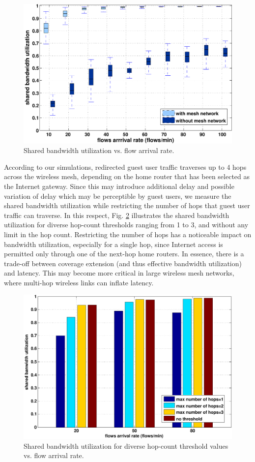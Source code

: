 \begin{figure}[t]
\begin{center}
\includegraphics[width=1\linewidth]{results/boxplot2.pdf}
\caption{Shared bandwidth utilization vs. flow arrival rate.}
\label{fig:utilization_arrival}
\end{center}
\end{figure}

According to our simulations, redirected guest user traffic traverses up to 4 hops across the wireless mesh, depending on the home router that has been selected as the Internet gateway. Since this may introduce additional delay and possible variation of delay which may be perceptible by guest users, we measure the shared bandwidth utilization while restricting the number of hops that guest user traffic can traverse. In this respect, Fig. \ref{fig:hop_count} illustrates the shared bandwidth utilization for diverse hop-count thresholds ranging from 1 to 3, and without any limit in the hop count. Restricting the number of hops has a noticeable impact on bandwidth utilization, especially for a single hop, since Internet access is permitted only through one of the next-hop home routers. In essence, there is a trade-off between coverage extension (and thus effective bandwidth utilization) and latency. This may become more critical in large wireless mesh networks, where multi-hop wireless links can inflate latency.


\begin{figure}[t]
\begin{center}
\includegraphics[width=1\linewidth]{results/hops_vs_BW.pdf}
\caption{Shared bandwidth utilization for diverse hop-count threshold values vs. flow arrival rate.}
\label{fig:hop_count}
\end{center}
\end{figure}

